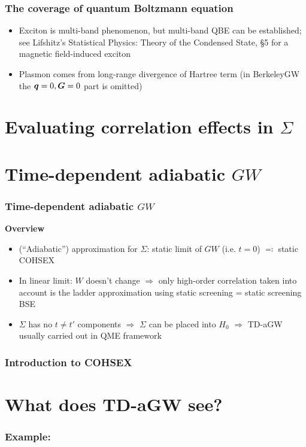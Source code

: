 \documentclass[t]{beamer}
\begin{document}
\begin{frame}
\frametitle{The coverage of quantum Boltzmann equation}

\begin{itemize}
    \item Exciton is multi-band phenomenon, but 
        multi-band QBE can be established; 
        see Lifshitz's Statistical Physics: Theory of the Condensed State, \S 5 
        for a magnetic field-induced exciton 
    \item Plasmon comes from long-range divergence of Hartree term
        (in BerkeleyGW the $\vb*{q} = 0, \vb*{G} = 0$ part is omitted)
\end{itemize}    

\end{frame}

\section{Evaluating correlation effects in $\Sigma$}



\section{Time-dependent adiabatic $GW$}

\begin{frame}
\frametitle{Time-dependent adiabatic $GW$}

\textbf{Overview} \begin{itemize}
    \item (``Adiabatic'') approximation for $\Sigma$: static limit of $GW$ (i.e. $t = 0$) $\eqqcolon$ static COHSEX
    \item In linear limit: $W$ doesn't change $\Rightarrow$ 
        only high-order correlation taken into account is the ladder approximation using 
        static screening = static screening BSE
    \item $\Sigma$ has no $t \neq t'$ components $\Rightarrow$
        $\Sigma$ can be placed into $H_0$
        $\Rightarrow$ TD-aGW usually carried out in QME framework
\end{itemize}    

\end{frame}

\begin{frame}
\frametitle{Introduction to COHSEX}

    

\end{frame}

\section{What does TD-aGW see?}

\begin{frame}
    \frametitle{Example: }

    

\end{frame}
\end{document}
